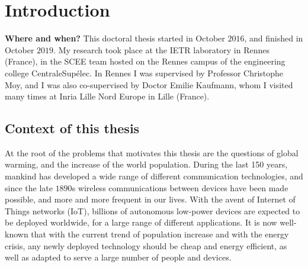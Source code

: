 
\chapter{Introduction}
\label{chapter:1}





\graphicspath{{2-Chapters/1-Chapter/Images/}}

\textbf{Where and when?}
%
This doctoral thesis started in October $2016$, and finished in October $2019$.
My research took place at the IETR laboratory in Rennes (France), in the SCEE team hosted on the Rennes campus of the engineering college CentraleSupélec.
In Rennes I was supervised by Professor Christophe Moy,
and I was also co-supervised by Doctor Emilie Kaufmann, whom I visited many times at Inria Lille Nord Europe in Lille (France).



\section{Context of this thesis}
\label{sec:1:problems}

%
At the root of the problems that motivates this thesis are the questions of global warming, and the increase of the world population.
During the last 150 years, mankind has developed a wide range of different communication technologies, and since the late $1890$s wireless communications between devices have been made possible, and more and more frequent in our lives.
With the avent of Internet of Things networks (IoT), billions of autonomous low-power devices are expected to be deployed worldwide, for a large range of different applications.
It is now well-known that with the current trend of population increase and with the energy crisis, any newly deployed technology should be cheap and energy efficient,
as well as adapted to serve a large number of people and devices.

